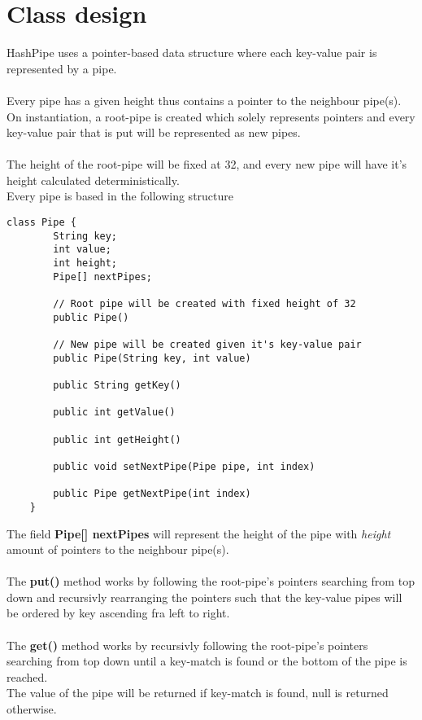\documentclass[a4paper,11pt]{article}
\begin{document}
\section*{Class design}
\begin{addmargin}[1em]{2em}
HashPipe uses a pointer-based data structure where each key-value pair is represented by a pipe.\\
\hspace{5mm}\\
Every pipe has a given height thus contains a pointer to the neighbour pipe(s).\\
On instantiation, a root-pipe is created which solely represents pointers and every key-value pair that is put will be represented as new pipes.\\
\hspace{5mm}\\
The height of the root-pipe will be fixed at 32, and every new pipe will have it's height calculated deterministically.\\
\newpage
Every pipe is based in the following structure
\begin{lstlisting}
class Pipe {
		String key;
		int value;
		int height;
		Pipe[] nextPipes;

		// Root pipe will be created with fixed height of 32
		public Pipe()

		// New pipe will be created given it's key-value pair
		public Pipe(String key, int value)

		public String getKey()

		public int getValue()

		public int getHeight()

		public void setNextPipe(Pipe pipe, int index)

		public Pipe getNextPipe(int index)
	}
\end{lstlisting}
The field \textbf{Pipe[] nextPipes} will represent the height of the pipe with \textit{height} amount of pointers to the neighbour pipe(s).\\ 
\hspace{5mm}\\
The \textbf{put()} method works by following the root-pipe's pointers searching from top down and recursivly rearranging the pointers such that the key-value pipes will be ordered by key ascending fra left to right.\\
\hspace{5mm}\\
The \textbf{get()} method works by recursivly following the root-pipe's pointers searching from top down until a key-match is found or the bottom of the pipe is reached.\\
The value of the pipe will be returned if key-match is found, null is returned otherwise.
\end{addmargin}
\newpage
\end{document}

